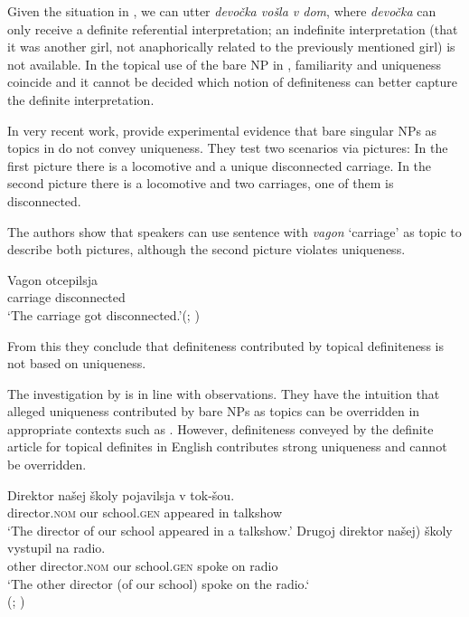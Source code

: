 \documentclass[output=paper]{langscibook}
\begin{document}
\noindent Given the situation in , we can utter \textit{devočka vošla v dom}, where \textit{devočka} can only receive a definite referential interpretation; an indefinite interpretation (that it was another girl, not anaphorically related to the previously mentioned girl) is not available. In the topical use of the bare NP in , familiarity and uniqueness coincide and it cannot be decided which notion of definiteness can better capture the definite interpretation.

In very recent work, \cite{Simik.Demian2020} provide experimental evidence that bare singular NPs as topics in  do not convey uniqueness. They test two scenarios via pictures: In the first picture there is a locomotive and a unique disconnected carriage. In the second picture there is a locomotive and two carriages, one of them is disconnected.

The authors show that  speakers can use sentence  with \textit{vagon} `carriage' as topic to describe both pictures, although the second picture violates uniqueness.

\ea \label{ex:10}
\gll Vagon    otcepilsja \\
    carriage  disconnected\\
\glt `The carriage got disconnected.'\hfill (; \citealt[15]{Simik.Demian2020})
\z

\noindent From this they conclude that definiteness contributed by topical definiteness is not based on uniqueness.

The investigation by  is in line with  observations. They have the intuition that alleged uniqueness contributed by bare NPs as topics can be overridden in appropriate contexts such as . However, definiteness conveyed by the definite article for topical definites in English contributes strong uniqueness and cannot be overridden.

\ea \label{ex:11}
\ea
\gll Direktor našej školy pojavilsja v tok-šou. \\
    director.\textsc{nom} our school.\textsc{gen} appeared in talkshow\\
\glt `The director of our school appeared in a talkshow.'
\ex
\gll Drugoj direktor \minsp{(} našej) školy vystupil na radio. \\
 other director.\textsc{nom} {} our school.\textsc{gen} spoke on radio\\
\glt  `The other director (of our school) spoke on the radio.`\\
\glt \hfill (; )
\z\z
\end{document}
